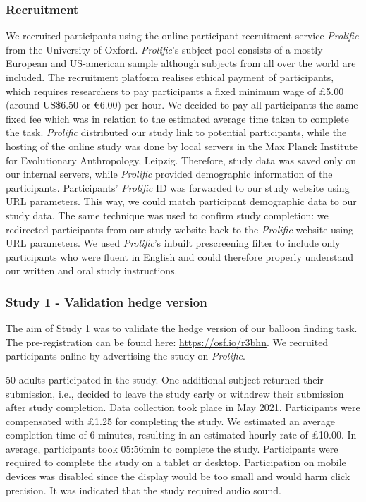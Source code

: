 \documentclass[
  man,floatsintext]{apa6}
\begin{document}
\hypertarget{recruitment}{%
\subsubsection{Recruitment}\label{recruitment}}

We recruited participants using the online participant recruitment service \emph{Prolific} from the University of Oxford. \emph{Prolific}'s subject pool consists of a mostly European and US-american sample although subjects from all over the world are included. The recruitment platform realises ethical payment of participants, which requires researchers to pay participants a fixed minimum wage of £5.00 (around US\$6.50 or €6.00) per hour. We decided to pay all participants the same fixed fee which was in relation to the estimated average time taken to complete the task.
\emph{Prolific} distributed our study link to potential participants, while the hosting of the online study was done by local servers in the Max Planck Institute for Evolutionary Anthropology, Leipzig. Therefore, study data was saved only on our internal servers, while \emph{Prolific} provided demographic information of the participants.
Participants' \emph{Prolific} ID was forwarded to our study website using URL parameters. This way, we could match participant demographic data to our study data. The same technique was used to confirm study completion: we redirected participants from our study website back to the \emph{Prolific} website using URL parameters.
We used \emph{Prolific}'s inbuilt prescreening filter to include only participants who were fluent in English and could therefore properly understand our written and oral study instructions.

\hypertarget{study-1---validation-hedge-version}{%
\subsubsection{Study 1 - Validation hedge version}\label{study-1---validation-hedge-version}}

The aim of Study 1 was to validate the hedge version of our balloon finding task. The pre-registration can be found here: \url{https://osf.io/r3bhn}. We recruited participants online by advertising the study on \emph{Prolific}.

50 adults participated in the study. One additional subject returned their submission, i.e., decided to leave the study early or withdrew their submission after study completion. Data collection took place in May 2021.
Participants were compensated with £1.25 for completing the study. We estimated an average completion time of 6 minutes, resulting in an estimated hourly rate of £10.00. In average, participants took 05:56min to complete the study.
Participants were required to complete the study on a tablet or desktop. Participation on mobile devices was disabled since the display would be too small and would harm click precision. It was indicated that the study required audio sound.
\end{document}
